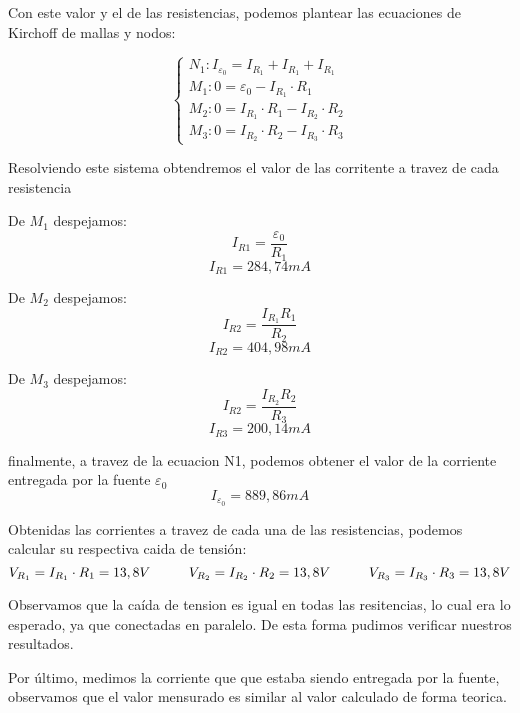 \documentclass[12pt]{report}
\begin{document}
Con este valor y el de las resistencias, podemos plantear las ecuaciones de Kirchoff de mallas y
nodos:

\[
\begin{cases}
  N_1 : I_{\varepsilon_0} = I_{R_1} + I_{R_1} + I_{R_1} \\
  M_1 : 0 = \varepsilon_0 - I_{R_1} \cdot R_1 \\
  M_2 : 0 = I_{R_1} \cdot R_1 - I_{R_2} \cdot R_2 \\
  M_3 : 0 = I_{R_2} \cdot R_2 - I_{R_3} \cdot R_3
\end{cases}
\]

Resolviendo este sistema obtendremos el valor de las corritente a travez de cada resistencia

\noindent
\begin{minipage}[t]{0.33\textwidth}
  \centering
  De $M_1$ despejamos:
  $$I_{R1} = \frac{\varepsilon_0}{R_1}$$
  $$I_{R1} = 284,74 mA $$
\end{minipage}
\begin{minipage}[t]{0.33\textwidth}
  \centering
  De $M_2$ despejamos:
  $$I_{R2} = \frac{I_{R_1}R_1}{R_2} $$
  $$I_{R2} = 404,98 mA $$
\end{minipage}
\begin{minipage}[t]{0.33\textwidth}
  \centering
  De $M_3$ despejamos:
  $$I_{R2} = \frac{I_{R_2}R_2}{R_3} $$
  $$I_{R3} = 200,14 mA $$
\end{minipage}

\vspace{7mm}

finalmente, a travez de la ecuacion N1, podemos obtener el valor de la corriente entregada 
por la fuente $\varepsilon_0$
$$I_{\varepsilon_0} = 889,86 mA$$

Obtenidas las corrientes a travez de cada una de las resistencias, podemos calcular su respectiva
caida de tensión:
$$ V_{R_1} = I_{R_1} \cdot R_1 = 13,8V \hspace{10mm} V_{R_2} = I_{R_2} \cdot R_2 = 13,8V 
\hspace{10mm} V_{R_3} = I_{R_3} \cdot R_3 = 13,8V $$

Observamos que la caída de tension es igual en todas las resitencias, lo cual era lo esperado, ya
que conectadas en paralelo. De esta forma pudimos verificar nuestros resultados.

Por último, medimos la corriente que que estaba siendo entregada por la fuente, observamos que el
valor mensurado es similar al valor calculado de forma teorica.
\end{document}
